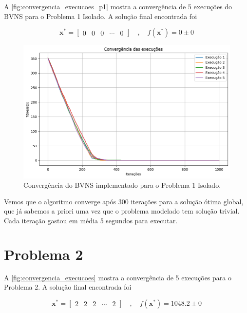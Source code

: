 \documentclass[
	12pt,				%
	oneside,			%
	a4paper,			%
	chapter=TITLE,
	sumario=tradicional,
	english,			%
	brazil				%
]{abntex2}
\begin{document}
A \autoref{fig:convergencia_execucoes_p1} mostra a convergência de 5 execuções 
do BVNS para o Problema 1 Isolado. A solução final encontrada foi 


\[  \mathbf{x^*} = \begin{bmatrix} 0 & 0 & 0 & \cdots & 0 \end{bmatrix} \quad , \quad f\left(\mathbf{x^*}\right) = 0 \pm 0 \]


\begin{figure}[h!]
	\caption{\label{fig:convergencia_execucoes_p1}Convergência do BVNS implementado para o Problema 1 Isolado.}
	\begin{center}
    \includegraphics[width=\textwidth,trim=1 1 1 1,clip]{convergencia_execucoes_p1.png}
	\end{center}
\end{figure}

Vemos que o algoritmo converge após 300 iterações para a solução 
ótima global, que já sabemos a priori uma vez que o problema modelado 
tem solução trivial. Cada iteração gastou em média 5 segundos para executar.

\section{Problema 2}

A \autoref{fig:convergencia_execucoes} mostra a convergência de 5 execuções
para o Problema 2. A solução final encontrada foi 

\[  \mathbf{x^*} = \begin{bmatrix} 2 & 2 & 2 & \cdots & 2 \end{bmatrix} \quad , \quad f\left(\mathbf{x^*}\right) = 1048.2 \pm 0 \]
\end{document}

